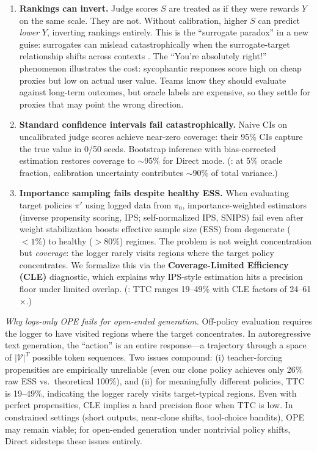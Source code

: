 \begin{enumerate}[leftmargin=*,itemsep=4pt,topsep=4pt]
\item \textbf{Rankings can invert.} Judge scores $S$ are treated as if they were rewards $Y$ on the same scale. They are not. Without calibration, higher $S$ can predict \emph{lower} $Y$, inverting rankings entirely. This is the ``surrogate paradox'' in a new guise: surrogates can mislead catastrophically when the surrogate-target relationship shifts across contexts \citep{FlemingDeMets1996}. The ``You're absolutely right!'' phenomenon illustrates the cost: sycophantic responses score high on cheap proxies but low on actual user value. Teams know they should evaluate against long-term outcomes, but oracle labels are expensive, so they settle for proxies that may point the wrong direction.

\item \textbf{Standard confidence intervals fail catastrophically.} Naive CIs on uncalibrated judge scores achieve near-zero coverage: their 95\% CIs capture the true value in 0/50 seeds. Bootstrap inference with bias-corrected estimation restores coverage to ${\sim}$95\% for Direct mode. (: at 5\% oracle fraction, calibration uncertainty contributes ${\sim}$90\% of total variance.)

\item \textbf{Importance sampling fails despite healthy ESS.} When evaluating target policies $\pi'$ using logged data from $\pi_0$, importance-weighted estimators (inverse propensity scoring, IPS; self-normalized IPS, SNIPS) fail even after weight stabilization boosts effective sample size (ESS) from degenerate ($<1\%$) to healthy ($>80\%$) regimes. The problem is not weight concentration but \emph{coverage}: the logger rarely visits regions where the target policy concentrates. We formalize this via the \textbf{Coverage-Limited Efficiency (CLE)} diagnostic, which explains why IPS-style estimation hits a precision floor under limited overlap. (: TTC ranges 19--49\% with CLE factors of 24--61$\times$.)
\end{enumerate}

\noindent\emph{Why logs-only OPE fails for open-ended generation.}
Off-policy evaluation requires the logger to have visited regions where the target concentrates. In autoregressive text generation, the ``action'' is an entire response---a trajectory through a space of $|\mathcal{V}|^T$ possible token sequences. Two issues compound: (i) teacher-forcing propensities are empirically unreliable (even our clone policy achieves only 26\% raw ESS vs.\ theoretical 100\%), and (ii) for meaningfully different policies, TTC is 19--49\%, indicating the logger rarely visits target-typical regions. Even with perfect propensities, CLE implies a hard precision floor when TTC is low. In constrained settings (short outputs, near-clone shifts, tool-choice bandits), OPE may remain viable; for open-ended generation under nontrivial policy shifts, Direct sidesteps these issues entirely.

